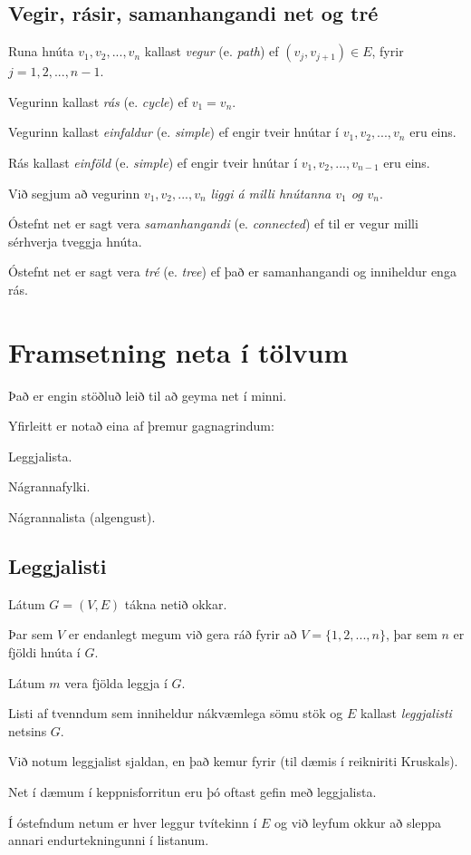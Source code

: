 \subsection{Vegir, rásir, samanhangandi net og tré}
{
	{
		\item<1-> Runa hnúta $v_1, v_2, ..., v_n$ kallast \emph{vegur} (e. \emph{path}) ef $(v_j, v_{j + 1}) \in E$, fyrir $j = 1, 2, ..., n - 1$.
		\item<2-> Vegurinn kallast \emph{rás} (e. \emph{cycle}) ef $v_1 = v_n$.
		\item<3-> Vegurinn kallast \emph{einfaldur} (e. \emph{simple}) ef engir tveir hnútar í $v_1, v_2, ..., v_n$ eru eins.
		\item<4-> Rás kallast \emph{einföld} (e. \emph{simple}) ef engir tveir hnútar í $v_1, v_2, ..., v_{n - 1}$ eru eins.
		\item<5-> Við segjum að vegurinn $v_1, v_2, ..., v_n$ \emph{liggi á milli hnútanna $v_1$ og $v_n$}.
		\item<6-> Óstefnt net er sagt vera \emph{samanhangandi} (e. \emph{connected}) ef til er vegur milli sérhverja tveggja hnúta.
		\item<7-> Óstefnt net er sagt vera \emph{tré} (e. \emph{tree}) ef það er samanhangandi og inniheldur enga rás.
	}
}

\section{Framsetning neta í tölvum}
{
	{
		\item<1-> Það er engin stöðluð leið til að geyma net í minni.
		\item<2-> Yfirleitt er notað eina af þremur gagnagrindum:
		{
			\item<3-> Leggjalista.
			\item<4-> Nágrannafylki.
			\item<5-> Nágrannalista (algengust).
		}
	}
}

\subsection{Leggjalisti}
{
	{
		\item<1-> Látum $G = (V, E)$ tákna netið okkar.
		\item<2-> Þar sem $V$ er endanlegt megum við gera ráð fyrir að $V = \{1, 2, ..., n\}$, þar sem $n$ er fjöldi hnúta í $G$.
		\item<3-> Látum $m$ vera fjölda leggja í $G$.
		\item<4-> Listi af tvenndum sem inniheldur nákvæmlega sömu stök og $E$ kallast \emph{leggjalisti} netsins $G$.
		\item<5-> Við notum leggjalist sjaldan, en það kemur fyrir (til dæmis í reikniriti Kruskals).
		\item<6-> Net í dæmum í keppnisforritun eru þó oftast gefin með leggjalista.
		\item<7-> Í óstefndum netum er hver leggur tvítekinn í $E$ og við leyfum okkur að sleppa annari endurtekningunni í listanum.
	}
}

